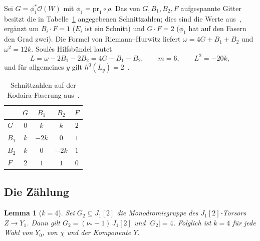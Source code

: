 \documentclass[11pt]{article}
\newtheorem{lemma}[theorem]{Lemma}
\theoremstyle{definition}
\theoremstyle{remark}
\newcommand{\OO}{\mathcal{O}}
\begin{document}
Sei $G=\phi_1^*\OO(W)$ mit $\phi_1=\mathrm{pr}_1\circ\rho$. Das von
$G,B_1,B_2,F$ aufgespannte Gitter besitzt die in Tabelle~\ref{tab:lattice}
angegebenen Schnittzahlen; dies sind die Werte aus~\cite[Prop.~8]{So26}, ergänzt
um $B_i\cdot F=1$ ($E_i$ ist ein Schnitt) und $G\cdot F=2$ ($\phi_1$ hat auf den
Fasern den Grad zwei). Die Formel von Riemann--Hurwitz liefert
$\omega=4G+B_1+B_2$ und $\omega^2=12k$. Soul\'es Hilfsbündel lautet
\[
L=\omega-2B_1-2B_2=4G-B_1-B_2,\qquad m=6,\qquad L^2=-20k,
\]
und für allgemeines $y$ gilt
$h^0(L_y)=2$~\cite[Prop.~9\,ii), iii), v)]{So26}.

\begin{table}[ht]
\centering
\begin{tabular}{@{}lcccc@{}}
\toprule
 & $G$ & $B_1$ & $B_2$ & $F$\\
\midrule
$G$ & $0$ & $k$ & $k$ & $2$\\
$B_1$ & $k$ & $-2k$ & $0$ & $1$\\
$B_2$ & $k$ & $0$ & $-2k$ & $1$\\
$F$ & $2$ & $1$ & $1$ & $0$\\
\bottomrule
\end{tabular}
\caption{Schnittzahlen auf der Kodaira-Faserung aus~\cite{So26}.}
\label{tab:lattice}
\end{table}

\subsection{Die Zählung}

\begin{lemma}[$k=4$]\label{lem:k4}
Sei $G_2\subseteq J_1[2]$ die Monodromiegruppe des $J_1[2]$-Torsors $Z\to Y_1$.
Dann gilt $G_2=(\nu_*-1)\,J_1[2]$ und $|G_2|=4$. Folglich ist $k=4$ für jede
Wahl von $Y_0$, von $\chi$ und der Komponente $Y$.
\end{lemma}
\end{document}
